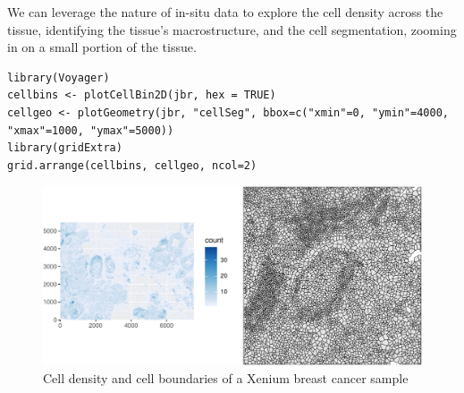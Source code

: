 \documentclass[graybox]{svmult}
\begin{document}

We can leverage the nature of in-situ data to explore the cell density across the
tissue, identifying the tissue's macrostructure, and the cell segmentation,
zooming in on a small portion of the tissue.

\begin{shaded}
\begin{verbatim}
library(Voyager)
cellbins <- plotCellBin2D(jbr, hex = TRUE)
cellgeo <- plotGeometry(jbr, "cellSeg", bbox=c("xmin"=0, "ymin"=4000, "xmax"=1000, "ymax"=5000))
library(gridExtra)
grid.arrange(cellbins, cellgeo, ncol=2)
\end{verbatim}
\end{shaded}

\begin{figure}
\includegraphics[width=1\linewidth,]{spatpdfs/plotvoyager-1} \caption{Cell density and cell boundaries of a Xenium breast cancer sample}\label{fig:plotvoyager}
\end{figure}
\end{document}
